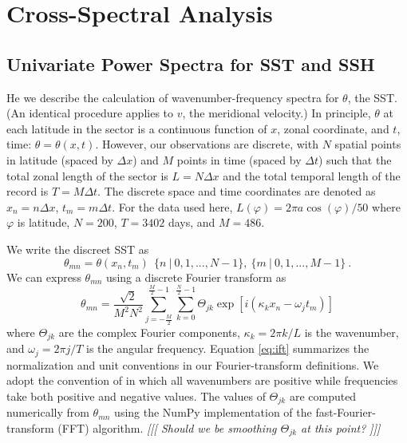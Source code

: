 \documentclass[10pt]{article}
\begin{document}
\section{Cross-Spectral Analysis}

\subsection{Univariate Power Spectra for SST and SSH}

He we describe the calculation of wavenumber-frequency spectra for $\theta$, the SST. (An identical procedure applies to $v$, the meridional velocity.) In principle, $\theta$ at each latitude in the sector is a continuous function of $x$, zonal coordinate, and $t$, time: $\theta = \theta(x,t)$. However, our observations are discrete, with $N$ spatial points in latitude (spaced by $\Delta x$) and $M$ points in time (spaced by $\Delta t$) such that the total zonal length of the sector is $L = N \Delta x$ and the total temporal length of the record is $T = M \Delta t$. The discrete space and time coordinates are denoted as $x_n = n \Delta x$, $t_m = m \Delta t$. For the data used here, $L(\varphi) = 2 \pi a \cos(\varphi) / 50$ where $\varphi$ is latitude, $N = 200$, $T = 3402$ days, and $M = 486$.

We write the discreet SST as
\begin{equation}
\theta_{mn} = \theta( x_n, t_m ) \ \ \{n\ |\ 0,1, ..., N-1\} ,\ \{m\ |\ 0,1, ..., M-1\} \ .
\end{equation}
We can express $\theta_{mn}$ using a discrete Fourier transform as
\begin{equation}
\theta_{mn} = \frac{\sqrt{2}}{M^2 N^2} \sum_{j=-\frac{M}{2}}^{\frac{M}{2}-1} \sum_{k=0}^{\frac{N}{2}-1} \Theta_{jk} \exp[ i (\kappa_k x_n - \omega_j t_m ) ] 
\label{eq:ift}
\end{equation}
where $\Theta_{jk}$ are the complex Fourier components, $\kappa_k = 2 \pi k / L$ is the wavenumber, and $\omega_j = 2 \pi j / T$ is the   angular frequency. %
Equation \eqref{eq:ift} summarizes the normalization and unit conventions in our Fourier-transform definitions.
We adopt the convention of \citet{RandelHeld1991} in which all wavenumbers are positive while frequencies take both positive and negative values. The values of $\Theta_{jk}$ are computed numerically from $\theta_{mn}$ using the NumPy implementation of the fast-Fourier-transform (FFT) algorithm. {\em [[[ Should we be smoothing $\Theta_{jk}$ at this point? ]]]}
\end{document}
